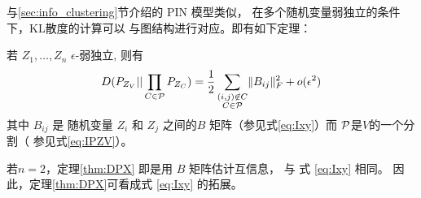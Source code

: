 与\ref{sec:info_clustering}节介绍的 PIN 模型类似，
在多个随机变量弱独立的条件下，KL散度的计算可以
与图结构进行对应。即有如下定理：
\begin{theorem}\label{thm:DPX}
若 $Z_1, \dots, Z_n$ $\epsilon$-弱独立, 则有
\begin{equation}\label{eq:PXV}
D(P_{Z_V} || \prod_{C\in \P} P_{Z_{C}}) = {1 \over 2}
\sum_{\substack{(i,j) \not\in C\\ C\in \P}} \norm{B_{ij}}_F^2 + o(\epsilon^2)
\end{equation}
其中 $B_{ij}$ 是 随机变量  $Z_i$ 和 $Z_j$
之间的$B$ 矩阵（参见式\ref{eq:Ixy}）而 $\P$是$V$的一个分割（
参见式\ref{eq:IPZV}）。 
\end{theorem}
若$ n = 2$，定理\ref{thm:DPX} 即是用 $B$ 矩阵估计互信息，
与 式 \eqref{eq:Ixy} 相同。
因此，定理\ref{thm:DPX}可看成式 \eqref{eq:Ixy} 
的拓展。

